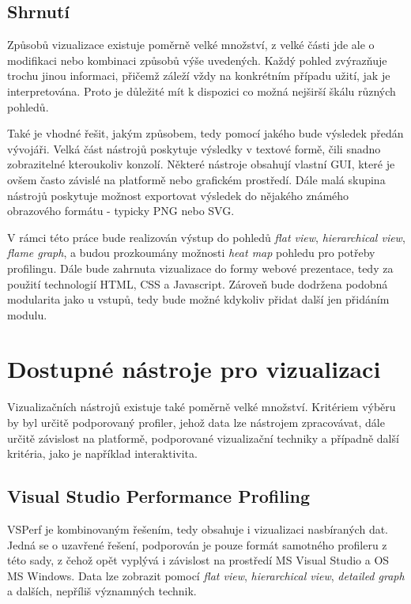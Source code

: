 \documentclass[czech,BP]{thesiskiv}
\begin{document}
\section{Shrnutí}

Způsobů vizualizace existuje poměrně velké množství, z velké části jde ale o modifikaci nebo kombinaci způsobů výše uvedených. Každý pohled zvýrazňuje trochu jinou informaci, přičemž záleží vždy na konkrétním případu užití, jak je interpretována. Proto je důležité mít k dispozici co možná nejširší škálu různých pohledů.

Také je vhodné řešit, jakým způsobem, tedy pomocí jakého  bude výsledek předán vývojáři. Velká část nástrojů poskytuje výsledky v textové formě, čili snadno zobrazitelné kteroukoliv konzolí. Některé nástroje obsahují vlastní GUI, které je ovšem často závislé na platformě nebo grafickém prostředí. Dále malá skupina nástrojů poskytuje možnost exportovat výsledek do nějakého známého obrazového formátu - typicky PNG nebo SVG.

V rámci této práce bude realizován výstup do pohledů \emph{flat view}, \emph{hierarchical view}, \emph{flame graph}, a budou prozkoumány možnosti \emph{heat map} pohledu pro potřeby profilingu. Dále bude zahrnuta vizualizace do formy webové prezentace, tedy za použití technologií HTML, CSS a Javascript. Zároveň bude dodržena podobná modularita jako u vstupů, tedy bude možné kdykoliv přidat další  jen přidáním modulu.


\newpage

\chapter{Dostupné nástroje pro vizualizaci}

Vizualizačních nástrojů existuje také poměrně velké množství. Kritériem výběru by byl určitě podporovaný profiler, jehož data lze nástrojem zpracovávat, dále určitě závislost na platformě, podporované vizualizační techniky a případně další kritéria, jako je například interaktivita.

\section{Visual Studio Performance Profiling}

VSPerf je kombinovaným řešením, tedy obsahuje i vizualizaci nasbíraných dat. Jedná se o uzavřené řešení, podporován je pouze formát samotného profileru z této sady, z čehož opět vyplývá i závislost na prostředí MS Visual Studio a OS MS Windows. Data lze zobrazit pomocí \emph{flat view}, \emph{hierarchical view}, \emph{detailed graph} a dalších, nepříliš významných technik.
\end{document}
